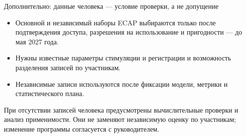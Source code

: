\begin{frame}{Дополнительно: данные человека --- условие проверки, а не допущение}
\begin{itemize}
\item Основной и независимый наборы ECAP выбираются только после подтверждения доступа, разрешения на использование и пригодности --- до мая 2027 года.
\item Нужны известные параметры стимуляции и регистрации и возможность разделения записей по участникам.
\item Независимые записи используются после фиксации модели, метрики и статистического плана.
\end{itemize}
\SlideGap
При отсутствии записей человека предусмотрены вычислительные проверки и анализ применимости. Они не заменяют независимую оценку по участникам; изменение программы согласуется с руководителем.
\end{frame}
